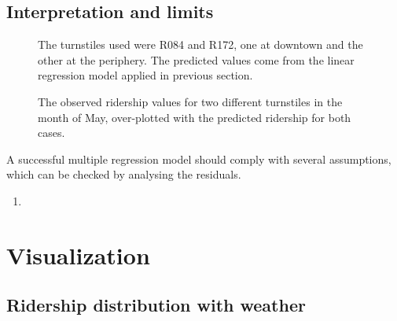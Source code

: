 \documentclass[letterpaper,10pt,english]{sphinxmanual}
\begin{document}
\section{Interpretation and limits}
\label{section2:interpretation-and-limits}\begin{figure}[htbp]
\centering
\capstart

\caption{The observed ridership values for two different turnstiles in the month of May,
over-plotted with the predicted ridership for both cases.}{\small 
The turnstiles used were R084 and R172, one at downtown and the other at the
periphery. The predicted values come from the linear regression model applied
in previous section.
}\label{section2:figure37}\end{figure}

A successful multiple regression model should comply with several assumptions,
which can be checked by analysing the residuals.
\begin{enumerate}
\item {} 
\end{enumerate}


\chapter{Visualization}
\label{section3:visualization}\label{section3::doc}

\section{Ridership distribution with weather}
\label{section3:ridership-distribution-with-weather}
\end{document}
